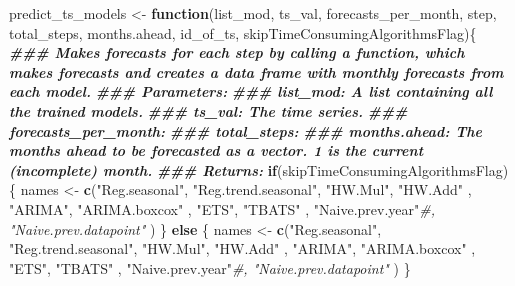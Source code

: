 \documentclass[
]{article}
\newenvironment{Shaded}{\begin{snugshade}}{\end{snugshade}}
\newcommand{\CommentTok}[1]{\textcolor[rgb]{0.56,0.35,0.01}{\textit{#1}}}
\newcommand{\ControlFlowTok}[1]{\textcolor[rgb]{0.13,0.29,0.53}{\textbf{#1}}}
\newcommand{\DocumentationTok}[1]{\textcolor[rgb]{0.56,0.35,0.01}{\textbf{\textit{#1}}}}
\newcommand{\FunctionTok}[1]{\textcolor[rgb]{0.13,0.29,0.53}{\textbf{#1}}}
\newcommand{\NormalTok}[1]{#1}
\newcommand{\OtherTok}[1]{\textcolor[rgb]{0.56,0.35,0.01}{#1}}
\newcommand{\StringTok}[1]{\textcolor[rgb]{0.31,0.60,0.02}{#1}}
\begin{document}
\begin{Shaded}
\begin{Highlighting}[]
\NormalTok{predict\_ts\_models }\OtherTok{\textless{}{-}} \ControlFlowTok{function}\NormalTok{(list\_mod, ts\_val, forecasts\_per\_month, step, total\_steps, months.ahead, id\_of\_ts, skipTimeConsumingAlgorithmsFlag)\{}
\DocumentationTok{\#\#\# Makes forecasts for each step by calling a function, which makes forecasts and creates a data frame with monthly forecasts from each model.}
\DocumentationTok{\#\#\# Parameters:}
\DocumentationTok{\#\#\# list\_mod: A list containing all the trained models.}
\DocumentationTok{\#\#\# ts\_val: The time series.}
\DocumentationTok{\#\#\# forecasts\_per\_month:}
\DocumentationTok{\#\#\# total\_steps: }
\DocumentationTok{\#\#\# months.ahead: The months ahead to be forecasted as a vector. 1 is the current (incomplete) month.}
\DocumentationTok{\#\#\# Returns: }
  \ControlFlowTok{if}\NormalTok{(skipTimeConsumingAlgorithmsFlag) \{}
\NormalTok{  names }\OtherTok{\textless{}{-}} \FunctionTok{c}\NormalTok{(}\StringTok{"Reg.seasonal"}\NormalTok{, }\StringTok{"Reg.trend.seasonal"}\NormalTok{,}
             \StringTok{"HW.Mul"}\NormalTok{, }\StringTok{"HW.Add"}
\NormalTok{             , }\StringTok{"ARIMA"}\NormalTok{, }\StringTok{"ARIMA.boxcox"}
\NormalTok{             , }\StringTok{"ETS"}\NormalTok{, }\StringTok{"TBATS"}
\NormalTok{             , }\StringTok{"Naive.prev.year"}\CommentTok{\#, "Naive.prev.datapoint"}
\NormalTok{             )}
\NormalTok{  \} }\ControlFlowTok{else}\NormalTok{ \{}
\NormalTok{    names }\OtherTok{\textless{}{-}} \FunctionTok{c}\NormalTok{(}\StringTok{"Reg.seasonal"}\NormalTok{, }\StringTok{"Reg.trend.seasonal"}\NormalTok{,}
               \StringTok{"HW.Mul"}\NormalTok{, }\StringTok{"HW.Add"}
\NormalTok{               , }\StringTok{"ARIMA"}\NormalTok{, }\StringTok{"ARIMA.boxcox"}
\NormalTok{               , }\StringTok{"ETS"}\NormalTok{, }\StringTok{"TBATS"}
\NormalTok{               , }\StringTok{"Naive.prev.year"}\CommentTok{\#, "Naive.prev.datapoint"}
\NormalTok{    )}
\NormalTok{  \}}
  

\end{Highlighting}
\end{Shaded}
\end{document}
